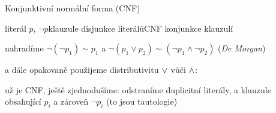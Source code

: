 \documentclass{beamer}
\begin{document}
\begin{frame}{Konjunktivní normální forma (CNF)}

    \alert{literál} $p$, $\neg p$\hfill \alert{klauzule} disjunkce literálů\hfill \alert{CNF} konjunkce klauzulí

    
    \pause

    \pause
    nahradíme \alert{$\neg (\neg p_1) \sim p_1$} a \alert{$\neg (p_1 \lor p_2) \sim (\neg p_1 \land \neg p_2)$} (\emph{De Morgan})

    \pause

    \pause
    a dále opakovaně použijeme \alert{distributivitu} \( {\lor} \) vůči \( {\land} \): \medskip

    \pause

    \pause
    už je CNF, ještě zjednodušíme: odstraníme duplicitní literály, a klauzule obsahující $p_i$ a zároveň $\neg p_i$ (to jsou \alert{tautologie})

    \pause

\end{frame}
\end{document}
